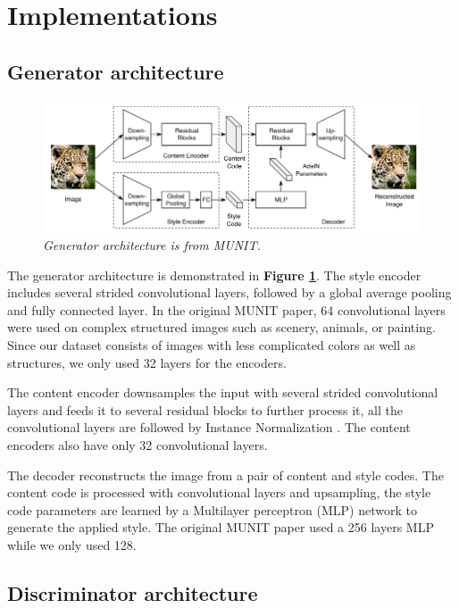 \documentclass[12pt]{report}
\begin{document}
\section{Implementations}
\subsection{Generator architecture}
\begin{figure}[h]
	\centering
	\includegraphics[scale=0.8]{gen-architecture}
	\caption{\textit{Generator architecture is from MUNIT\cite{munit}.}}
	\label{fig:gen-architecture}
\end{figure}
The generator architecture is demonstrated in \textbf{Figure \ref{fig:gen-architecture}}. The style encoder includes several strided convolutional layers, followed by a global average pooling and fully connected layer. In the original MUNIT paper\cite{munit}, 64 convolutional layers were used on complex structured images such as scenery, animals, or painting. Since our dataset consists of images with less complicated colors as well as structures, we only used 32 layers for the encoders.

The content encoder downsamples the input with several strided convolutional layers and feeds it to several residual blocks \cite{resnet} to further process it, all the convolutional layers are followed by Instance Normalization \cite{instance-norm}. The content encoders also have only 32 convolutional layers.

The decoder reconstructs the image from a pair of content and style codes. The content code is processed with convolutional layers and upsampling, the style code parameters are learned by a Multilayer perceptron (MLP) \cite{mlp} network to generate the applied style. The original MUNIT paper\cite{munit} used a 256 layers MLP while we only used 128.


\subsection{Discriminator architecture}
\end{document}

